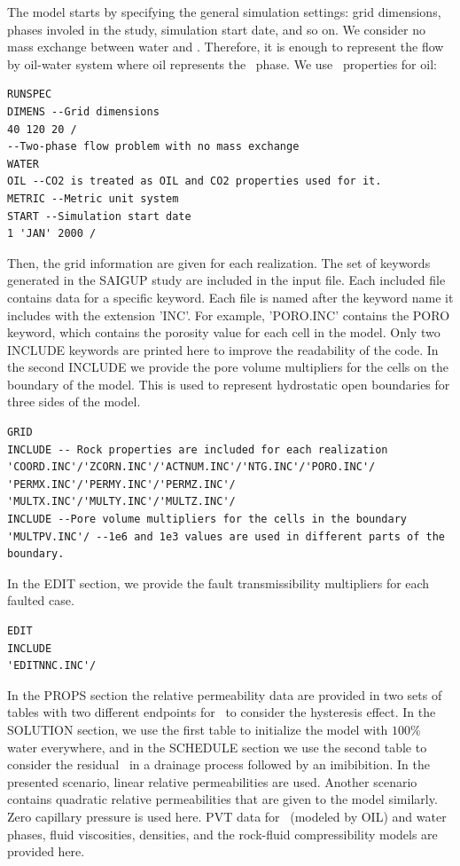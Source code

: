 The model starts by specifying the general simulation settings: grid dimensions, phases involed in the study, simulation start date, and so on. We consider no mass exchange between water and \coo. Therefore, it is enough to represent the flow by oil-water system where oil represents the \coo\ phase. We use \coo\ properties for oil:  
\begin{lstlisting}
RUNSPEC 
DIMENS --Grid dimensions
40 120 20 / 
--Two-phase flow problem with no mass exchange
WATER 
OIL --CO2 is treated as OIL and CO2 properties used for it.
METRIC --Metric unit system
START --Simulation start date 
1 'JAN' 2000 /  
\end{lstlisting}
Then, the grid information are given for each realization. The set of keywords generated in the SAIGUP study are included in the input file. Each included file contains data for a specific keyword. Each file is named after the keyword name it includes with the extension 'INC'. For example, 'PORO.INC' contains the PORO keyword, which contains the porosity value for each cell in the model. Only two INCLUDE keywords are printed  here to improve the readability of the code. In the second INCLUDE we provide the pore volume multipliers for the cells on the boundary of the model. This is used to represent hydrostatic open boundaries for three sides of the model.
\begin{lstlisting}
GRID 
INCLUDE -- Rock properties are included for each realization
'COORD.INC'/'ZCORN.INC'/'ACTNUM.INC'/'NTG.INC'/'PORO.INC'/
'PERMX.INC'/'PERMY.INC'/'PERMZ.INC'/
'MULTX.INC'/'MULTY.INC'/'MULTZ.INC'/
INCLUDE --Pore volume multipliers for the cells in the boundary
'MULTPV.INC'/ --1e6 and 1e3 values are used in different parts of the boundary.
\end{lstlisting}
In the EDIT section, we provide the fault transmissibility multipliers for each faulted case.
\begin{lstlisting}
EDIT
INCLUDE
'EDITNNC.INC'/ 
\end{lstlisting}
In the PROPS section the relative permeability data are provided in two sets of tables with two different endpoints for \coo\ to consider the hysteresis effect. In the SOLUTION section, we use the first table to initialize the model with $100\%$ water everywhere, and in the SCHEDULE section we use the second table to consider the residual \coo\ in a drainage process followed by an imibibition.  In the presented scenario, linear relative permeabilities are used. Another scenario contains quadratic relative permeabilities that are given to the model similarly. Zero capillary pressure is used here. PVT data for \coo~(modeled by OIL) and water phases, fluid viscosities, densities, and the rock-fluid compressibility models are provided here.  

